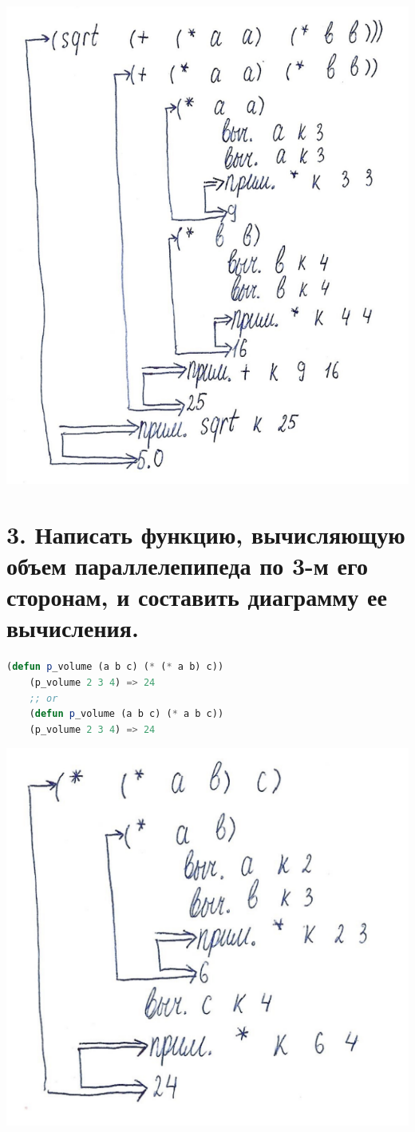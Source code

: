 \documentclass[12pt]{report}
\begin{document}
\includegraphics[scale=1]{img/2}

\section*{3. Написать функцию, вычисляющую объем параллелепипеда по 3-м его сторонам, и составить диаграмму ее вычисления.}

\begin{lstlisting}[language=Lisp]
	 (defun p_volume (a b c) (* (* a b) c))
	(p_volume 2 3 4) => 24 
	;; or
	(defun p_volume (a b c) (* a b c))
	(p_volume 2 3 4) => 24 
\end{lstlisting}

\includegraphics[scale=1]{img/3}
\end{document}
